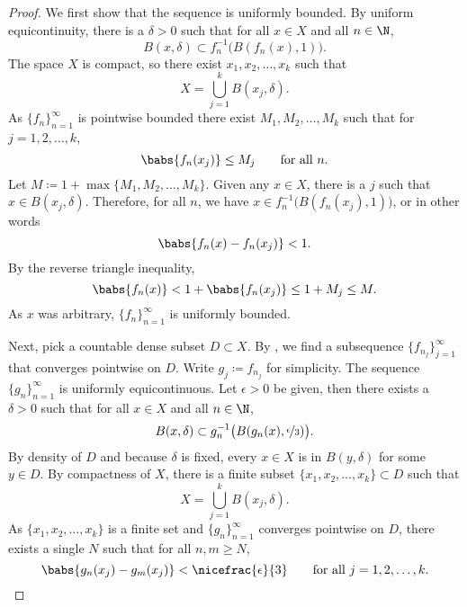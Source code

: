 \begin{proof}
We first show that the sequence is uniformly bounded.
By uniform equicontinuity,
there is a $\delta > 0$
such that
for all $x \in X$ and all $n \in \N$,
\begin{equation*}
B(x,\delta) \subset f_n^{-1}\bigl(B(f_n(x),1)\bigr) .
\end{equation*}
The space $X$ is compact, so there exist $x_1,x_2,\ldots,x_k$
such that
\begin{equation*}
X = \bigcup_{j=1}^k B(x_j,\delta) .
\end{equation*}
As $\{ f_n \}_{n=1}^\infty$ is pointwise bounded there exist $M_1,M_2,\ldots,M_k$
such that for $j=1,2,\ldots,k$,
\begin{equation*}
\babs{f_n(x_j)} \leq M_j \qquad \text{for all } n.
\end{equation*}
Let $M \coloneqq 1+ \max \{ M_1,M_2,\ldots,M_k \}$.  Given any
$x \in X$, there is a $j$ such that $x \in B(x_j,\delta)$.  Therefore,
for all $n$, we have
$x \in f_n^{-1}\bigl(B(f_n(x_j),1)\bigr)$, or in other words
\begin{equation*}
\babs{f_n(x)-f_n(x_j)} < 1 .
\end{equation*}
By the reverse triangle inequality,
\begin{equation*}
\babs{f_n(x)} < 1+ \babs{f_n(x_j)} \leq 1+M_j \leq M .
\end{equation*}
As $x$ was arbitrary, $\{f_n\}_{n=1}^\infty$ is uniformly bounded.


Next, pick a countable dense subset $D \subset X$.
By , we find
a subsequence $\{ f_{n_j} \}_{j=1}^\infty$ that converges pointwise on $D$.
Write $g_j \coloneqq f_{n_j}$ for simplicity.
The sequence $\{ g_n \}_{n=1}^\infty$ is 
uniformly equicontinuous.
Let $\epsilon > 0$ be given, then there exists a $\delta > 0$
such that for all $x \in X$ and all $n \in \N$,
\begin{equation*}
B(x,\delta) \subset g_n^{-1}\bigl(B(g_n(x),\nicefrac{\epsilon}{3})\bigr).
\end{equation*}
By density of $D$ and because $\delta$ is fixed, every $x \in X$ is in $B(y,\delta)$
for some $y \in D$.  By compactness of $X$,
there is a finite subset $\{ x_1,x_2,\ldots,x_k \} \subset D$
such that
\begin{equation*}
X = \bigcup_{j=1}^k B(x_j,\delta) .
\end{equation*}
As $\{ x_1,x_2,\ldots,x_k \}$
is a finite set and $\{ g_n \}_{n=1}^\infty$
converges pointwise on $D$, there exists a single $N$ such that for 
all $n,m \geq N$,
\begin{equation*}
\babs{g_n(x_j)-g_m(x_j)} < \nicefrac{\epsilon}{3}
 \qquad \text{for all } j=1,2,\ldots,k.
\end{equation*}


\end{proof}
